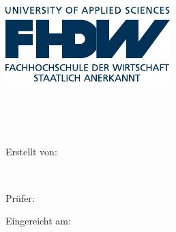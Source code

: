 
\begin{titlepage}

\begin{center}


\includegraphics[scale=1.20]{static/fhdw.pdf}\\

\vspace{.7cm}

\Huge{\bfseries\dokumententyp}

~\vspace{.5cm}\\

\LARGE{\dokumententitel}\\


~\vspace{1.3cm}\\


\large

Erstellt von:\\\vspace{1mm}

\dokumentenautor{}\\

\vspace{1.5cm}

Prüfer:\vspace{1mm}\\

\dokumentenpruefer{}


\vspace{1.22cm}

Eingereicht am:\vspace{1mm}\\

\abgabedatum{}

\end{center}

\end{titlepage}

